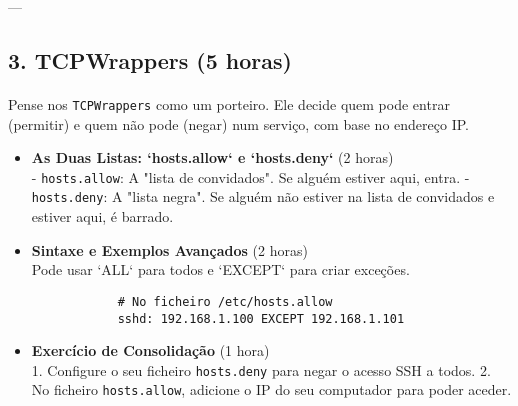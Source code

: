 \documentclass[10pt,a4paper]{article}
\newcommand{\guia}[1]{\textcolor{darkblue}{#1}} %
\begin{document}
	---
	
	\guia{
	}
	\subsection*{3. TCPWrappers (5 horas)}
	\vspace{-1.2em}
	\paragraph{}
	Pense nos \texttt{TCPWrappers} como um porteiro. Ele decide quem pode entrar (permitir) e quem não pode (negar) num serviço, com base no endereço IP.
	
	\begin{itemize}
		\item \textbf{As Duas Listas: `hosts.allow` e `hosts.deny`} (2 horas) \\
		- \texttt{hosts.allow}: A "lista de convidados". Se alguém estiver aqui, entra.
		- \texttt{hosts.deny}: A "lista negra". Se alguém não estiver na lista de convidados e estiver aqui, é barrado.
		
		\item \textbf{Sintaxe e Exemplos Avançados} (2 horas) \\
		Pode usar `ALL` para todos e `EXCEPT` para criar exceções.
		\begin{verbatim}
			# No ficheiro /etc/hosts.allow
			sshd: 192.168.1.100 EXCEPT 192.168.1.101
		\end{verbatim}
		
		\item \textbf{Exercício de Consolidação} (1 hora) \\
		1. Configure o seu ficheiro \texttt{hosts.deny} para negar o acesso SSH a todos.
		2. No ficheiro \texttt{hosts.allow}, adicione o IP do seu computador para poder aceder.
	\end{itemize}
	
\end{document}
